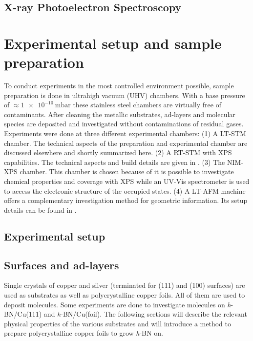 \documentclass[10pt,a4paper,twoside
,BCOR=8mm				%
,headings=normal		%
,headsepline			%
,footsepline			%
,plainfootsepline		%
]{scrbook}
\begin{document}
  \section{\textbf{X}-ray \textbf{P}hotoelectron \textbf{S}pectroscopy}
	

\chapter{Experimental setup and sample preparation}
To conduct experiments in the most controlled environment possible, sample preparation is done in ultrahigh vacuum (UHV) chambers. With a base pressure of $\approx \SI{1e-10}{\milli \bar}$ these stainless steel chambers are virtually free of contaminants. After cleaning the metallic substrates, ad-layers and molecular species are deposited and investigated without contaminations of residual gases.  Experiments were done at three different experimental chambers: (1) A LT-STM chamber. The technical aspects of the preparation and experimental chamber are discussed elsewhere \cite{urgel_tendero_two-dimensional_2015, schwarz_assembly_2018, wiengarten_scanning_2015} and shortly summarized here. (2) A RT-STM with XPS capabilities. The technical aspects and build details are given in \cite{schwarz_assembly_2018}. (3) The NIM-XPS chamber. This chamber is chosen because of it is possible to investigate chemical properties and coverage with XPS while an UV-Vis spectrometer is used to access the electronic structure of the occupied states. (4) A LT-AFM machine offers a complementary investigation method for geometric information. Its setup details can be found in \cite{he_bottom-up_2017}.

  \section{Experimental setup}
    
  \section{Surfaces and ad-layers}
  Single crystals of copper and silver (terminated for (111) and (100) surfaces) are used as substrates as well as polycrystalline copper foils. All of them are used to deposit molecules. Some experiments are done to investigate molecules on \textit{h}-BN/Cu(111) and \textit{h}-BN/Cu(foil). The following sections will describe the relevant physical properties of the various substrates and will introduce a method to prepare polycrystalline copper foils to grow \textit{h}-BN on.
\end{document}
